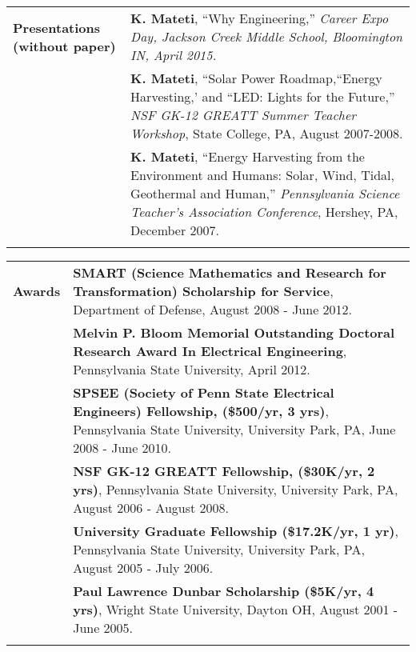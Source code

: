 \documentclass{article}[16pt]
\newlength{\lcolw}
\newlength{\rcolw}
\newlength{\hlcolw}
\begin{document}
\begin{tabular}{L{\hlcolw}  L{\rcolw}}
\textbf{\Large Presentations (without paper)} 
& \textbf{K. Mateti}, ``Why Engineering,'' {\it Career Expo Day, Jackson Creek Middle School, Bloomington IN, April 2015.}
\vspace{0.1in} \\ 
 & \textbf{K. Mateti}, ``Solar Power Roadmap,``Energy Harvesting,' and ``LED: Lights for the Future,'' {\em NSF GK-12 GREATT Summer Teacher Workshop}, State College, PA, August 2007-2008.
\vspace{0.1in} \\ 
& \textbf{K. Mateti}, ``Energy Harvesting from the Environment and Humans:
Solar, Wind, Tidal, Geothermal and Human,'' {\em Pennsylvania Science
  Teacher's Association Conference}, Hershey, PA, December 2007.
\vspace{0.1in} \\ 
\hline \\
\end{tabular}



\begin{tabular}{L{\hlcolw}  L{\rcolw}}
\textbf{\Large Awards} 
 & \textbf{SMART (Science Mathematics and Research for Transformation) Scholarship for Service}, Department of Defense, August 2008 - June 2012.
\vspace{0.1in} \\ 
 &\textbf{Melvin P. Bloom Memorial Outstanding Doctoral Research Award In Electrical Engineering}, Pennsylvania State University, April 2012.
\vspace{0.1in} \\ 
 & \textbf{SPSEE (Society of Penn State Electrical Engineers) Fellowship, (\$500/yr, 3 yrs)}, Pennsylvania State University, University Park, PA, June 2008 - June 2010.
\vspace{0.1in} \\ 
 & \textbf{NSF GK-12 GREATT Fellowship, (\$30K/yr, 2 yrs)}, Pennsylvania State University, University Park, PA, August 2006 - August 2008. 
\vspace{0.1in} \\ 
 & \textbf{University Graduate Fellowship (\$17.2K/yr, 1 yr)}, Pennsylvania State University, University Park, PA, August 2005 - July 2006.
\vspace{0.1in} \\ 
 & \textbf{Paul Lawrence Dunbar Scholarship (\$5K/yr, 4 yrs)}, Wright State
  University, Dayton OH, August 2001 - June 2005.
	\vspace{0.1in} \\ 
\hline \\
\end{tabular}
\end{document}
